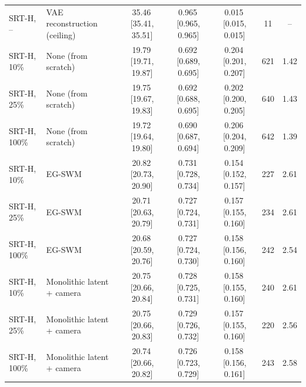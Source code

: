\begin{tabular}{llccccc}
SRT-H, -- & VAE reconstruction (ceiling) & 35.46\,{\scriptsize[35.41, 35.51]} & 0.965\,{\scriptsize[0.965, 0.965]} & 0.015\,{\scriptsize[0.015, 0.015]} & 11 & -- \\
SRT-H, 10\% & None (from scratch) & 19.79\,{\scriptsize[19.71, 19.87]} & 0.692\,{\scriptsize[0.689, 0.695]} & 0.204\,{\scriptsize[0.201, 0.207]} & 621 & 1.42 \\
SRT-H, 25\% & None (from scratch) & 19.75\,{\scriptsize[19.67, 19.83]} & 0.692\,{\scriptsize[0.688, 0.695]} & 0.202\,{\scriptsize[0.200, 0.205]} & 640 & 1.43 \\
SRT-H, 100\% & None (from scratch) & 19.72\,{\scriptsize[19.64, 19.80]} & 0.690\,{\scriptsize[0.687, 0.694]} & 0.206\,{\scriptsize[0.204, 0.209]} & 642 & 1.39 \\
SRT-H, 10\% & EG-SWM & 20.82\,{\scriptsize[20.73, 20.90]} & 0.731\,{\scriptsize[0.728, 0.734]} & 0.154\,{\scriptsize[0.152, 0.157]} & 227 & 2.61 \\
SRT-H, 25\% & EG-SWM & 20.71\,{\scriptsize[20.63, 20.79]} & 0.727\,{\scriptsize[0.724, 0.731]} & 0.157\,{\scriptsize[0.155, 0.160]} & 234 & 2.61 \\
SRT-H, 100\% & EG-SWM & 20.68\,{\scriptsize[20.59, 20.76]} & 0.727\,{\scriptsize[0.724, 0.730]} & 0.158\,{\scriptsize[0.156, 0.160]} & 242 & 2.54 \\
SRT-H, 10\% & Monolithic latent + camera & 20.75\,{\scriptsize[20.66, 20.84]} & 0.728\,{\scriptsize[0.725, 0.731]} & 0.158\,{\scriptsize[0.155, 0.160]} & 240 & 2.61 \\
SRT-H, 25\% & Monolithic latent + camera & 20.75\,{\scriptsize[20.66, 20.83]} & 0.729\,{\scriptsize[0.726, 0.732]} & 0.157\,{\scriptsize[0.155, 0.160]} & 220 & 2.56 \\
SRT-H, 100\% & Monolithic latent + camera & 20.74\,{\scriptsize[20.66, 20.82]} & 0.726\,{\scriptsize[0.723, 0.729]} & 0.158\,{\scriptsize[0.156, 0.161]} & 243 & 2.58 \\
\bottomrule
\end{tabular}
